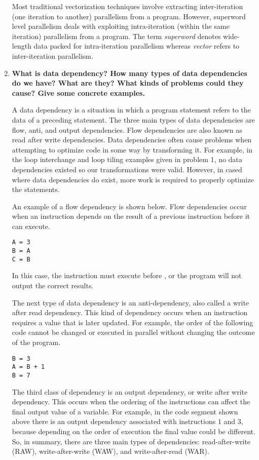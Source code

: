 \documentclass[10pt]{article} %
\begin{document}
\begin{enumerate}
Most traditional vectorization techniques involve extracting inter-iteration (one iteration to another) parallelism from a program.  However, superword level parallelism deals with exploiting intra-iteration (within the same iteration) parallelism from a program.  The term \textit{superword} denotes wide-length data packed for intra-iteration parallelism whereas \textit{vector} refers to inter-iteration parallelism.  

\item %
\textbf{What is data dependency?  How many types of data dependencies do we have?  What are they?  What kinds of problems could they cause?  Give some concrete examples.  }

A data dependency is a situation in which a program statement refers to the data of a preceding statement.  The three main types of data dependencies are flow, anti, and output dependencies.  Flow dependencies are also known as read after write dependencies.  Data dependencies often cause problems when attempting to optimize code in some way by transforming it.  For example, in the loop interchange and loop tiling examples given in problem 1, no data dependencies existed so our transformations were valid.  However, in cased where data dependencies do exist, more work is required to properly optimize the statements.  

An example of a flow dependency is shown below.  Flow dependencies occur when an instruction depends on the result of a previous instruction before it can execute.  

\begin{verbatim}
A = 3
B = A
C = B
\end{verbatim}

In this case, the instruction  must execute before , or the program will not output the correct results.  

The next type of data dependency is an anti-dependency, also called a write after read dependency.  This kind of dependency occurs when an instruction requires a value that is later updated.  For example, the order of the following code cannot be changed or executed in parallel without changing the outcome of the program.  

\begin{verbatim}
B = 3
A = B + 1
B = 7
\end{verbatim}

The third class of dependency is an output dependency, or write after write dependency.  This occurs when the ordering of the instructions can affect the final output value of a variable.  For example, in the code segment shown above there is an output dependency associated with instructions $1$ and $3$, because depending on the order of execution the final value could be different.  So, in summary, there are three main types of dependencies: read-after-write (RAW), write-after-write (WAW), and write-after-read (WAR).  


\end{enumerate}
\end{document}
